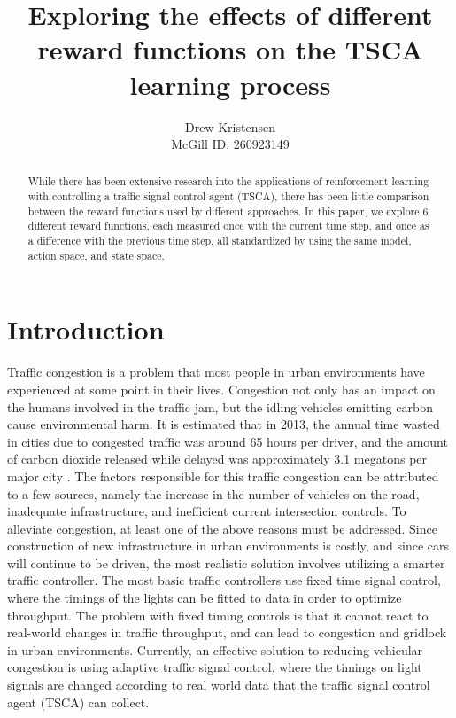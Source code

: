 \documentclass[12pt,twocolumn]{article}
\title{Exploring the effects of different reward functions on the TSCA learning process}
\author{Drew Kristensen\\McGill ID: 260923149}
\begin{document}
\maketitle

\begin{abstract}
While there has been extensive research into the applications of reinforcement learning with controlling a traffic signal control agent (TSCA), there has been little comparison between the reward functions used by different approaches. In this paper, we explore 6 different reward functions, each measured once with the current time step, and once as a difference with the previous time step, all standardized by using the same model, action space, and state space.
\end{abstract}

\section{Introduction}
Traffic congestion is a problem that most people in urban environments have experienced at some point in their lives. Congestion not only has an impact on the humans involved in the traffic jam, but the idling vehicles emitting carbon cause environmental harm.
It is estimated that in 2013, the annual time wasted in cities due to congested traffic was around 65 hours per driver, and the amount of carbon dioxide released while delayed was approximately 3.1 megatons per major city \cite{CEBR}.
The factors responsible for this traffic congestion can be attributed to a few sources, namely the increase in the number of vehicles on the road, inadequate infrastructure, and inefficient current intersection controls.
To alleviate congestion, at least one of the above reasons must be addressed.
Since construction of new infrastructure in urban environments is costly, and since cars will continue to be driven, the most realistic solution involves utilizing a smarter traffic controller.
The most basic traffic controllers use fixed time signal control, where the timings of the lights can be fitted to data in order to optimize throughput.
The problem with fixed timing controls is that it cannot react to real-world changes in traffic throughput, and can lead to congestion and gridlock in urban environments. 
Currently, an effective solution to reducing vehicular congestion is using adaptive traffic signal control, where the timings on light signals are changed according to real world data that the traffic signal control agent (TSCA) can collect.
\end{document}
